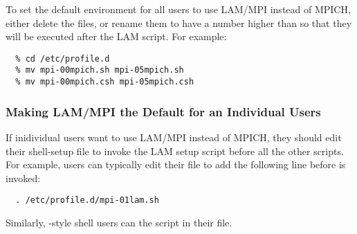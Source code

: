 To set the default environment for all users to use LAM/MPI instead of
MPICH, either delete the  files, or rename them to
have a number higher than  so that they will be executed
after the LAM script.  For example:

\begin{verbatim}
  % cd /etc/profile.d
  % mv mpi-00mpich.sh mpi-05mpich.sh
  % mv mpi-00mpich.csh mpi-05mpich.csh
\end{verbatim}

\subsubsection{Making LAM/MPI the Default for an Individual Users}

If inidividual users want to use LAM/MPI instead of MPICH, they should
edit their shell-setup file to invoke the LAM  setup
script before all the other  scripts.  For
example,  users can typically edit their  file
to add the following line before  is invoked:

\begin{verbatim}
  . /etc/profile.d/mpi-01lam.sh
\end{verbatim}

Similarly, -style shell users can  the
 script in their  file.


